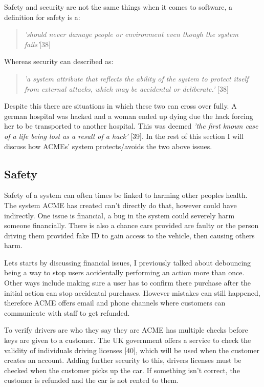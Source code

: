   Safety and security are not the same things when it comes to software, a definition for safety is a:
  \begin{quote}
    \textit{'should never damage people or environment even though the system fails'}[38]
  \end{quote}

  Whereas security can described as:
  \begin{quote}
    \textit{'a system attribute that reflects the ability of the system to protect itself from external attacks, which may be accidental or deliberate.'} [38]
  \end{quote}

  Despite this there are situations in which these two can cross over fully. A german hospital was hacked and a woman ended up dying due the hack forcing her 
  to be transported to another hospital. This was deemed \textit{'the first known case of a life being lost as a result of a hack'} [39].
  In the rest of this section I will discuss how ACMEs' system protects/avoids the two above issues.

  \subsection{Safety}
  Safety of a system can often times be linked to harming other peoples health. The system ACME has created can't directly do that, however could have 
  indirectly. One issue is financial, a bug in the system could severely harm someone financially. There is also a chance cars provided 
  are faulty or the person driving them provided fake ID to gain access to the vehicle, then causing others harm.

  Lets starts by discussing financial issues, I previously talked about debouncing being a way to stop users accidentally performing an action more than
  once. Other ways include making sure a user has to confirm there purchase after the initial action can stop accidental purchases. However mistakes can 
  still happened, therefore ACME offers email and phone channels where customers can communicate with staff to get refunded.

  To verify drivers are who they say they are ACME has multiple checks before keys are given to a customer. The UK government offers a service to check 
  the validity of individuals driving licenses [40], which will be used when the customer creates an account. Adding further security to this, drivers licenses
  must be checked when the customer picks up the car. If something isn't correct, the customer is refunded and the car is not rented to them.

